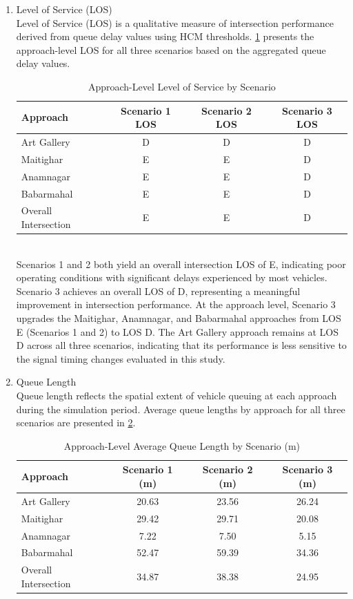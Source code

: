 \begin{enumerate}[label=\alph*.]
   \item Level of Service (LOS) \\
   Level of Service (LOS) is a qualitative measure of intersection performance derived from queue delay values using HCM thresholds. \cref{tab:los} presents the approach-level LOS for all three scenarios based on the aggregated queue delay values.
   \begin{table}[h!]
   \centering
   \caption{Approach-Level Level of Service by Scenario}
   \begin{tabular}{|l|c|c|c|}
   \hline
   Approach & Scenario 1 LOS & Scenario 2 LOS & Scenario 3 LOS \\
   \hline
   Art Gallery & D & D & D \\
   Maitighar & E & E & D \\
   Anamnagar & E & E & D \\
   Babarmahal & E & E & D \\
   \hline
   Overall Intersection & E & E &D \\
   \hline
   \end{tabular}
   \label{tab:los}
   \end{table}
   \\Scenarios 1 and 2 both yield an overall intersection LOS of E, indicating poor operating conditions with significant delays experienced by most vehicles. Scenario 3 achieves an overall LOS of D, representing a meaningful improvement in intersection performance. At the approach level, Scenario 3 upgrades the Maitighar, Anamnagar, and Babarmahal approaches from LOS E (Scenarios 1 and 2) to LOS D. The Art Gallery approach remains at LOS D across all three scenarios, indicating that its performance is less sensitive to the signal timing changes evaluated in this study.
   
   \item Queue Length \\
   Queue length reflects the spatial extent of vehicle queuing at each approach during the simulation period. Average queue lengths by approach for all three scenarios are presented in \cref{tab:queuelength}.

   \begin{table}[h!]
   \centering
   \caption{Approach-Level Average Queue Length by Scenario (m)}
   \begin{tabular}{|l|c|c|c|}
   \hline
   Approach & Scenario 1 (m) & Scenario 2 (m) & Scenario 3 (m) \\
   \hline
   Art Gallery & 20.63 & 23.56 & 26.24 \\
   Maitighar & 29.42 & 29.71 & 20.08 \\
   Anamnagar & 7.22 & 7.50 & 5.15 \\
   Babarmahal & 52.47 & 59.39 & 34.36 \\
   \hline
   Overall Intersection & 34.87 & 38.38 & 24.95 \\
   \hline
   \end{tabular}
   \label{tab:queuelength}
   \end{table}


\end{enumerate}
